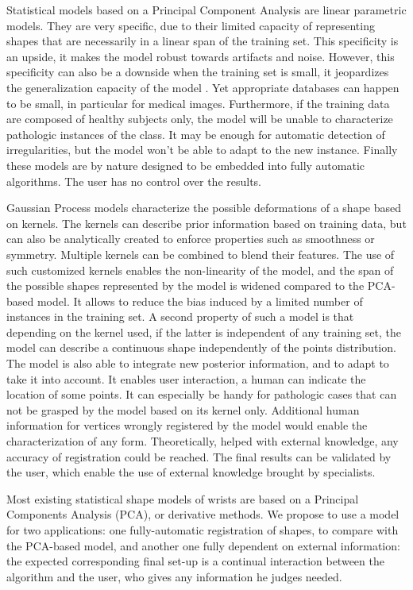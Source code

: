 Statistical models based on a Principal Component Analysis are linear parametric models. They are very specific, due to their limited capacity of representing shapes that are necessarily in a linear span of the training set. This specificity is an upside, it makes the model robust towards artifacts and noise. However, this specificity can also be a downside when the training set is small, it jeopardizes the generalization capacity of the model \cite{luthi_2017_shape}. Yet appropriate databases can happen to be small, in particular for medical images. Furthermore, if the training data are composed of healthy subjects only, the model will be unable to characterize pathologic instances of the class. It may be enough for automatic detection of irregularities, but the model won't be able to adapt to the new instance. 
Finally these models are by nature designed to be embedded into fully automatic algorithms. The user has no control over the results. 


Gaussian Process models characterize the possible deformations of a shape based on kernels. The kernels can describe prior information based on training data, but can also be analytically created to enforce properties such as smoothness or symmetry. Multiple kernels can be combined to blend their features. The use of such customized kernels enables the non-linearity of the model, and the span of the possible shapes represented by the model is widened compared to the PCA-based model. It allows to reduce the bias induced by a limited number of instances in the training set. A second property of such a model is that depending on the kernel used, if the latter is independent of any training set, the model can describe a continuous shape independently of the points distribution. The model is also able to integrate new posterior information, and to adapt to take it into account. It enables user interaction, a human can indicate the location of some points. It can especially be handy for pathologic cases that can not be grasped by the model based on its kernel only. Additional human information for vertices wrongly registered by the model would enable the characterization of any form. Theoretically, helped with external knowledge, any accuracy of registration could be reached. The final results can be validated by the user, which enable the use of external knowledge brought by specialists.

Most existing statistical shape models of wrists are based on a Principal Components Analysis (PCA), or derivative methods. 
We propose to use a model for two applications: one fully-automatic registration of shapes, to compare with the PCA-based model, and another one fully dependent on external information: the expected corresponding final set-up is a continual interaction between the algorithm and the user, who gives any information he judges needed. 

